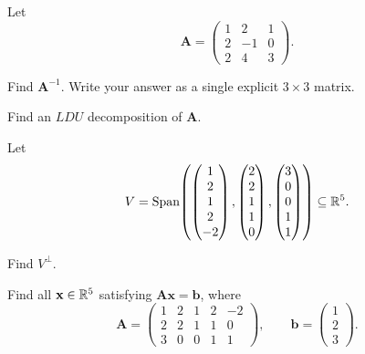 \begin{problem}
Let
\[
\mathbf A=
\begin{pmatrix}
1&2&1\\
2&-1&0\\
2&4&3
\end{pmatrix}.
\]
\begin{problemsubparts}
\item Find $\mathbf A^{-1}$. Write your answer as a single explicit $3\times3$ matrix.
\item Find an $LDU$ decomposition of $\mathbf A$.
\end{problemsubparts}
\end{problem}

\begin{problem}
Let
\[
V=\operatorname{Span}\!\left(
\begin{pmatrix}1\\2\\1\\2\\-2\end{pmatrix},
\begin{pmatrix}2\\2\\1\\1\\0\end{pmatrix},
\begin{pmatrix}3\\0\\0\\1\\1\end{pmatrix}
\right)\subseteq\mathbb{R}^5.
\]
\begin{problemsubparts}
\item Find $V^\perp$.
\item Find all $\mathbf x\in\mathbb{R}^5$ satisfying $\mathbf A\mathbf x=\mathbf b$, where
\[
\mathbf A=
\begin{pmatrix}
1&2&1&2&-2\\
2&2&1&1&0\\
3&0&0&1&1
\end{pmatrix},
\qquad
\mathbf b=
\begin{pmatrix}
1\\2\\3
\end{pmatrix}.
\]
\end{problemsubparts}
\end{problem}

